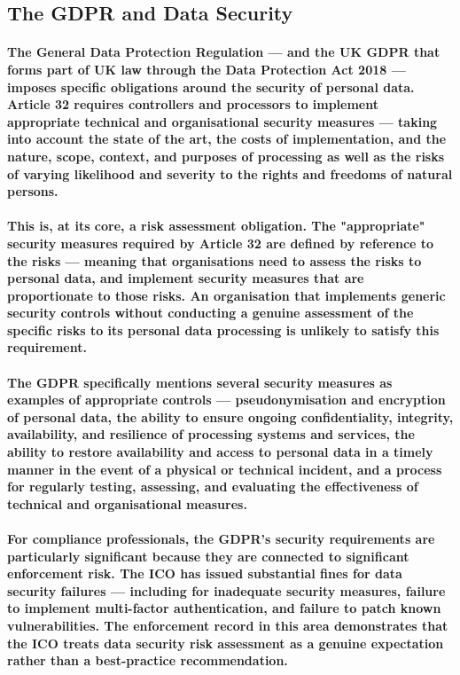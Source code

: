 \subsection{The GDPR and Data Security}
\paragraph{The \textbf{General Data Protection Regulation} — and the \textbf{UK GDPR} that forms part of UK law through the Data Protection Act 2018 — imposes specific obligations around the security of personal data. Article 32 requires controllers and processors to implement appropriate technical and organisational security measures — taking into account the state of the art, the costs of implementation, and the nature, scope, context, and purposes of processing as well as the risks of varying likelihood and severity to the rights and freedoms of natural persons.}
\paragraph{This is, at its core, a risk assessment obligation. The "appropriate" security measures required by Article 32 are defined by reference to the risks — meaning that organisations need to assess the risks to personal data, and implement security measures that are proportionate to those risks. An organisation that implements generic security controls without conducting a genuine assessment of the specific risks to its personal data processing is unlikely to satisfy this requirement.}
\paragraph{The GDPR specifically mentions several security measures as examples of appropriate controls — pseudonymisation and encryption of personal data, the ability to ensure ongoing confidentiality, integrity, availability, and resilience of processing systems and services, the ability to restore availability and access to personal data in a timely manner in the event of a physical or technical incident, and a process for regularly testing, assessing, and evaluating the effectiveness of technical and organisational measures.}
\paragraph{For compliance professionals, the GDPR's security requirements are particularly significant because they are connected to significant enforcement risk. The ICO has issued substantial fines for data security failures — including for inadequate security measures, failure to implement multi-factor authentication, and failure to patch known vulnerabilities. The enforcement record in this area demonstrates that the ICO treats data security risk assessment as a genuine expectation rather than a best-practice recommendation.}

